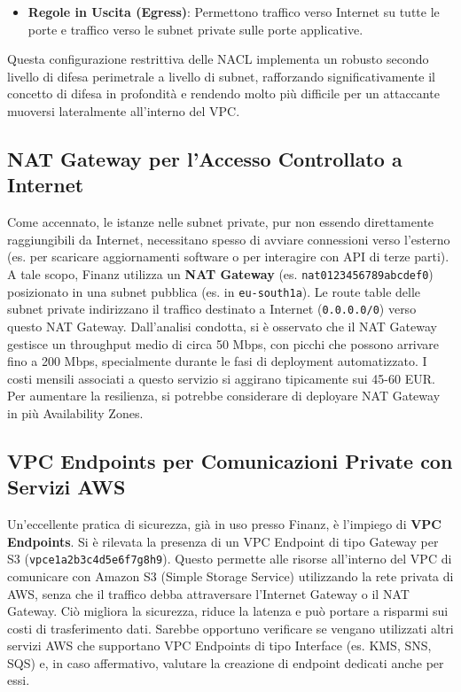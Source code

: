 \begin{itemize}
\begin{itemize}
\begin{itemize}
\item \textbf{Regole in Uscita (Egress)}: Permettono traffico verso Internet su tutte le porte e traffico verso le subnet private sulle porte applicative.
\end{itemize}
\end{itemize}
Questa configurazione restrittiva delle NACL implementa un robusto secondo livello di difesa perimetrale a livello di subnet, rafforzando significativamente il concetto di difesa in profondità e rendendo molto più difficile per un attaccante muoversi lateralmente all'interno del VPC.
\end{itemize}

\subsection{NAT Gateway per l'Accesso Controllato a Internet}
\label{subsec:nat-gateway_cap2}
Come accennato, le istanze nelle subnet private, pur non essendo direttamente raggiungibili da Internet, necessitano spesso di avviare connessioni verso l'esterno (es. per scaricare aggiornamenti software o per interagire con API di terze parti). A tale scopo, Finanz utilizza un \textbf{NAT Gateway} (es. \texttt{nat\discretionary{-}{}{-}0123456789abcdef0}) posizionato in una subnet pubblica (es. in \texttt{eu-south\discretionary{-}{}{-}1a}). Le route table delle subnet private indirizzano il traffico destinato a Internet (\texttt{0.0.0.0/0}) verso questo NAT Gateway.
Dall'analisi condotta, si è osservato che il NAT Gateway gestisce un throughput medio di circa 50 Mbps, con picchi che possono arrivare fino a 200 Mbps, specialmente durante le fasi di deployment automatizzato. I costi mensili associati a questo servizio si aggirano tipicamente sui 45-60 EUR. Per aumentare la resilienza, si potrebbe considerare di deployare NAT Gateway in più Availability Zones.

\subsection{VPC Endpoints per Comunicazioni Private con Servizi AWS}
\label{subsec:vpc-endpoints_cap2}
Un'eccellente pratica di sicurezza, già in uso presso Finanz, è l'impiego di \textbf{VPC Endpoints}. Si è rilevata la presenza di un VPC Endpoint di tipo Gateway per S3 (\texttt{vpce\discretionary{-}{}{-}1a2b3c4d5e6f7g8h9}). Questo permette alle risorse all'interno del VPC di comunicare con Amazon S3 (Simple Storage Service) utilizzando la rete privata di AWS, senza che il traffico debba attraversare l'Internet Gateway o il NAT Gateway. Ciò migliora la sicurezza, riduce la latenza e può portare a risparmi sui costi di trasferimento dati.
Sarebbe opportuno verificare se vengano utilizzati altri servizi AWS che supportano VPC Endpoints di tipo Interface (es. KMS, SNS, SQS) e, in caso affermativo, valutare la creazione di endpoint dedicati anche per essi.

